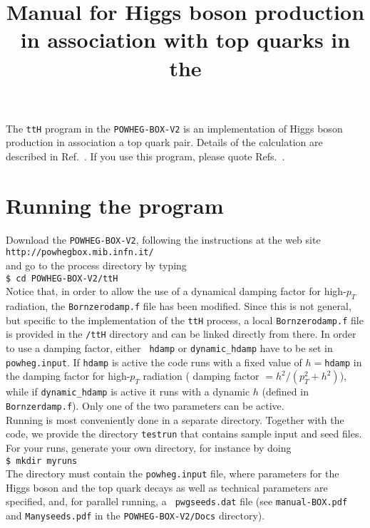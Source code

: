 \documentclass[a4paper,11pt]{article}
\title{Manual for  Higgs boson production in association with top quarks in the \POWHEGBOXV{}}
\date{}
\newcommand\POWHEGBOXV{{\tt POWHEG-BOX-V2}}
\begin{document}
\maketitle
%
\noindent
The {\tt ttH} program in the \POWHEGBOXV{} is an implementation of Higgs boson production in association a top quark pair. Details of the calculation are described in Ref.~\cite{HJRW}. If you use this program, please quote Refs.~\cite{HJRW,DORW,DJORW,Alioli:2010xd}.
%
\section*{Running the program}
%
Download the \POWHEGBOXV{}, following the instructions at the web site
\\[2ex]
{\tt http://powhegbox.mib.infn.it/}
\\[2ex]
and go to the process directory by typing
\\[2ex]
{\tt \$ cd \POWHEGBOXV/ttH}
\\[2ex]
Notice that, in order to allow the use of a dynamical damping factor
for high-$p_T$ radiation, the {\tt Bornzerodamp.f} file has been
modified. Since this is not general, but specific to the
implementation of the {\tt ttH} process, a local {\tt Bornzerodamp.f}
file is provided in the {\tt /ttH} directory and can be linked
directly from there.  In order to use a damping factor, either {\tt
  hdamp} or {\tt dynamic\_hdamp} have to be set in {\tt powheg.input}.
If {\tt hdamp} is active the code runs with a fixed value of $h=${\tt hdamp} in
the damping factor for high-$p_T$ radiation ( damping factor
$=h^2/(p_T^2+h^2)$), while if {\tt dynamic\_hdamp} is active it runs
with a dynamic $h$ (defined in {\tt Bornzerdamp.f}). Only one of the
two parameters can be active.
\\[2ex]
Running is most conveniently done in a separate directory. Together
with the code, we provide the directory {\tt testrun} that contains
sample input and seed files.
\\[2ex]
For your runs, generate your own directory, for instance by doing
\\[2ex]
{\tt \$ mkdir myruns}
\\[2ex]
The directory must contain the {\tt powheg.input} file, where
parameters for the Higgs boson and the top quark decays as well as
technical parameters are specified, and, for parallel running, a {\tt
  pwgseeds.dat} file (see {\tt manual-BOX.pdf} and {\tt Manyseeds.pdf}
in the {\tt POWHEG-BOX-V2/Docs} directory).
\\[2ex]
\end{document}
